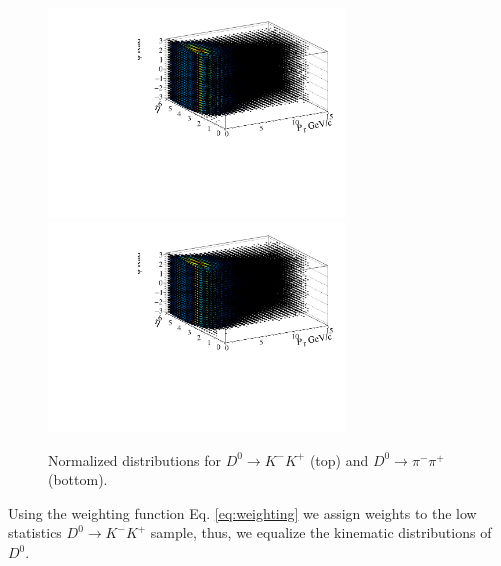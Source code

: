 \documentclass{article}
\begin{document}
    \begin{figure}[h!]
        \centering
        \includegraphics[width = 0.7\textwidth]{../../work/RapidSimAnalysis/WeightingFunction/Plots/KmKpNormalizedDistribution.pdf}
        \includegraphics[width = 0.7\textwidth]{../../work/RapidSimAnalysis/WeightingFunction/Plots/pimpipNormalizedDistribution.pdf}
        \caption{Normalized distributions for $D^0\to K^-K^+$ (top) and $D^0\to \pi^-\pi^+$ (bottom).}
    \end{figure}

    Using the weighting function Eq. \ref{eq:weighting} we assign weights to the low statistics $D^0 \to K^-K^+$ sample, thus, we equalize the kinematic distributions of $D^0$.
\end{document}
